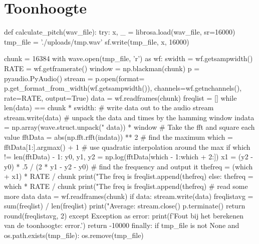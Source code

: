 \section{Toonhoogte}
\label{bijlage:toonhoogte}
\begin{python}
def calculate_pitch(wav_file):
    try:
        x, _ = librosa.load(wav_file, sr=16000)
        tmp_file = './uploads/tmp.wav'
        sf.write(tmp_file, x, 16000)

        chunk = 16384
        with wave.open(tmp_file, 'r') as wf:
            swidth = wf.getsampwidth()
            RATE = wf.getframerate()
            window = np.blackman(chunk)
            p = pyaudio.PyAudio()
            stream = p.open(format=
                p.get_format_from_width(wf.getsampwidth()),
                channels=wf.getnchannels(),
                rate=RATE,
                output=True)
            data = wf.readframes(chunk)
            freqlist = []
            while len(data) == chunk * swidth:
                # write data out to the audio stream
                stream.write(data)
                # unpack the data and times by the hamming window
                indata = np.array(wave.struct.unpack("%
                data)) * window
                # Take the fft and square each value
                fftData = abs(np.fft.rfft(indata)) ** 2
                # find the maximum
                which = fftData[1:].argmax() + 1
                # use quadratic interpolation around the max
                if which != len(fftData) - 1:
                    y0, y1, y2 = np.log(fftData[which - 1:which + 2:])
                    x1 = (y2 - y0) * .5 / (2 * y1 - y2 - y0)
                    # find the frequency and output it
                    thefreq = (which + x1) * RATE / chunk
                    print("The freq is %
                    freqlist.append(thefreq)
                else:
                    thefreq = which * RATE / chunk
                    print("The freq is %
                    freqlist.append(thefreq)
                # read some more data
                data = wf.readframes(chunk)
        if data:
            stream.write(data)
        freqlistavg = sum(freqlist) / len(freqlist)
        print("Average: %
        stream.close()
        p.terminate()
        return round(freqlistavg, 2)
    except Exception as error:
        print(f'Fout bij het berekenen van de toonhoogte: {error}.')
        return -10000
    finally:
        if tmp_file is not None and os.path.exists(tmp_file):
            os.remove(tmp_file)
\end{python}

